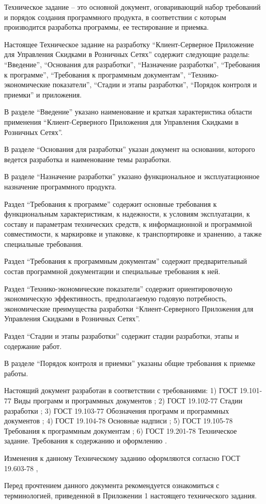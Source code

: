 
\tab[0.75cm] Техническое задание – это основной документ, оговаривающий набор требований и
порядок создания программного продукта, в соответствии с которым производится разработка
программы, ее тестирование и приемка.

Настоящее Техническое задание на разработку ``Клиент-Серверное Приложение для Управления Скидками в Розничных Сетях'' содержит следующие разделы: ``Введение'', ``Основания для разработки'',
``Назначение разработки'', ``Требования к программе'', ``Требования к программным документам'',
``Технико-экономические показатели'', ``Стадии и этапы разработки'', ``Порядок контроля и
приемки'' и приложения.

В разделе ``Введение'' указано наименование и краткая характеристика области применения
``Клиент-Серверного Приложения для Управления Скидками в Розничных Сетях''.

В разделе ``Основания для разработки'' указан документ на основании, которого ведется
разработка и наименование темы разработки.

В разделе ``Назначение разработки'' указано функциональное и эксплуатационное
назначение программного продукта.

Раздел ``Требования к программе'' содержит основные требования к функциональным
характеристикам, к надежности, к условиям эксплуатации, к составу и параметрам технических
средств, к информационной и программной совместимости, к маркировке и упаковке, к
транспортировке и хранению, а также специальные требования.

Раздел ``Требования к программным документам'' содержит предварительный состав
программной документации и специальные требования к ней.

Раздел ``Технико-экономические показатели'' содержит ориентировочную экономическую
эффективность, предполагаемую годовую потребность, экономические преимущества разработки
``Клиент-Серверного Приложения для Управления Скидками в Розничных Сетях''.

Раздел ``Стадии и этапы разработки'' содержит стадии разработки, этапы и содержание
работ.

В разделе ``Порядок контроля и приемки'' указаны общие требования к приемке работы.

Настоящий документ разработан в соответствии с требованиями:
1) ГОСТ 19.101-77 Виды программ и программных документов \cite{gost_types_of_software};
2) ГОСТ 19.102-77 Стадии разработки \cite{gost_stages_of_devel};
3) ГОСТ 19.103-77 Обозначения программ и программных документов \cite{gost_marking_software};
4) ГОСТ 19.104-78 Основные надписи \cite{gost_main_signs};
5) ГОСТ 19.105-78 Требования к программным документам \cite{gost_demands_for_docs};
6) ГОСТ 19.201-78 Техническое задание. Требования к содержанию и оформлению \cite{gost_tz}.


Изменения к данному Техническому заданию оформляются согласно ГОСТ 19.603-78 \cite{gost_main_rules_change},

Перед прочтением данного документа рекомендуется ознакомиться с терминологией,
приведенной в Приложении 1 настоящего технического задания.
